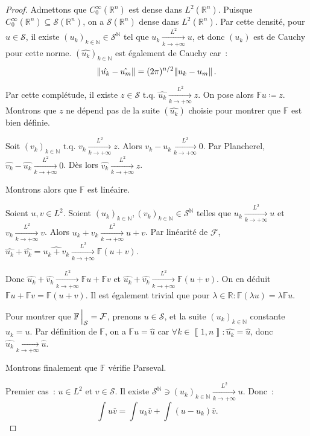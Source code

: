 \documentclass{report}
\newcommand{\R}{{\mathbb R}}
\newcommand{\N}{{\mathbb N}}
\newcommand{\tq}{\text{ t.q. }}
\newcommand{\pinfty}{{+\infty}}
\newcommand{\intint}[2]{\left\llbracket#1, #2\right\rrbracket}
\theoremstyle{definition}
\theoremstyle{remark}
\begin{document}
\begin{proof} Admettons que $C_0^\infty(\R^n)$ est dense dans $L^2(\R^n)$. Puisque $C_0^\infty(\R^n) \subseteq \mathcal S(\R^n)$, on a $\mathcal S(\R^n)$ dense dans $L^2(\R^n)$.
Par cette densité, pour $u \in \mathcal S$, il existe $(u_k)_{k \in \N} \in \mathcal S^\N$ tel que $u_k \xrightarrow[k \to \pinfty]{L^2} u$, et donc $(u_k)$ est de Cauchy
pour cette norme. $(\hat {u_k})_{k \in \N}$ est également de Cauchy car~:
\[\norm {\hat {u_k} - \hat {u_m}} = (2\pi)^{n/2}\norm {u_k - u_m}.\]

Par cette complétude, il existe $z \in \mathcal S \tq \hat {u_k} \xrightarrow[k \to \pinfty]{L^2} z$. On pose alors $\mathbb Fu \coloneqq z$. Montrons que $z$ ne dépend pas
de la suite $(\hat {u_k})$ choisie pour montrer que $\mathbb F$ est bien définie.

Soit $(v_k)_{k \in \N} \tq v_k \xrightarrow[k \to \pinfty]{L^2} z$. Alors $v_k-u_k \xrightarrow[k \to \pinfty]{L^2} 0$. Par Plancherel,
$\hat {v_k}-\hat {u_k} \xrightarrow[k \to \pinfty]{L^2} 0$. Dès lors $\hat {v_k} \xrightarrow[k \to \pinfty]{L^2} z$.

Montrons alors que $\mathbb F$ est linéaire.

Soient $u, v \in L^2$. Soient $(u_k)_{k \in \N}, (v_k)_{k \in \N} \in \mathcal S^\N$ telles que $u_k \xrightarrow[k \to \pinfty]{L^2} u$ et $v_k \xrightarrow[k \to \pinfty]{L^2} v$.
Alors $u_k+v_k \xrightarrow[k \to \pinfty]{L^2} u+v$. Par linéarité de $\mathcal F$, $\hat {u_k} + \hat {v_k} = \widehat {u_k + v_k} \xrightarrow[k \to \pinfty]{L^2} \mathbb F(u+v)$.

Donc $\hat {u_k} + \hat {v_k} \xrightarrow[k \to \pinfty]{L^2} \mathbb Fu + \mathbb Fv$ et $\hat {u_k} + \hat {v_k} \xrightarrow[k \to \pinfty]{L^2} \mathbb F(u+v)$.
On en déduit $\mathbb F u + \mathbb F v = \mathbb F(u+v)$. Il est également trivial que pour $\lambda \in \R : \mathbb F(\lambda u) = \lambda \mathbb Fu$.

Pour montrer que $\mathbb F\sVert[2]_{\mathcal S} = \mathcal F$, prenons $u \in \mathcal S$, et la suite $(u_k)_{k \in \N}$ constante $u_k = u$. Par définition de $\mathbb F$,
on a $\mathbb Fu = \hat u$ car $\forall k \in \intint 1n : \hat {u_k} = \hat u$, donc $\hat {u_k} \xrightarrow[k \to \pinfty]{} \hat u$.

Montrons finalement que $\mathbb F$  vérifie Parseval.

Premier cas~: $u \in L^2$ et $v \in \mathcal S$. Il existe $\mathcal S^\N \ni (u_k)_{k \in \N} \xrightarrow[k \to \pinfty]{L^2} u$. Donc~:
\[\int u\overline v = \int u_k\overline v + \int (u-u_k)\overline v.\]


\end{proof}
\end{document}
